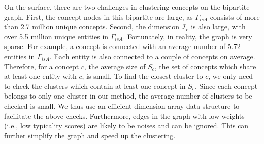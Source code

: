 On the surface, there are two challenges in clustering concepts
on the bipartite graph. First, the concept nodes in this bipartite are large,
as $\Gamma_{isA}$ consists of more than 2.7 million unique concepts.
Second, the dimension $\mathcal{I}_c$ is also large, with
over 5.5 million unique entities in $\Gamma_{isA}$.
Fortunately, in reality, the graph is very sparse.
For example, a concept is connected with an average
number of 5.72 entities in $\Gamma_{isA}$. Each entity is also connected to a couple of concepts on average.
Therefore, for a concept $c$, the average size of $S_c$,
the set of concepts which share at least
one entity with $c$, is small.
To find the closest cluster to $c$,
we only need to check the clusters which contain at
least one concept in $S_c$. Since each concept belongs to only one
cluster in our method, the average number of clusters to be checked is small.
We thus use an efficient dimension array data structure\cite{Cao:2008}
to facilitate the above checks.
Furthermore, edges in the graph with low weights (i.e., low typicality scores)
are likely to be noises and can be ignored. This can further simplify the graph
and speed up the clustering.
%


